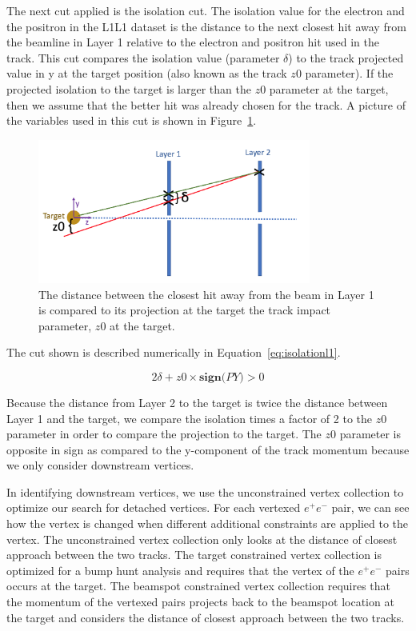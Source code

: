 The next cut applied is the isolation cut. The isolation value for the electron and the positron in the L1L1 dataset is the distance to the next closest hit away from the beamline in Layer 1 relative to the electron and positron hit used in the track. This cut compares the isolation value (parameter $\delta$) to the track projected value in y at the target position (also known as the track $z0$ parameter). If the projected isolation to the target is larger than the $z0$ parameter at the target, then we assume that the better hit was already chosen for the track. A picture of the variables used in this cut is shown in Figure~\ref{fig:isoPic}.

\begin{figure}[htb]
  \centering
      \includegraphics[width=0.8\textwidth]{pics/searching/isolationPic.png}
  \caption[Track isolation cut]{The distance between the closest hit away from the beam in Layer 1 is compared to its projection at the target the track impact parameter, $z0$ at the target. }
  \label{fig:isoPic}
\end{figure}

The cut shown is described numerically in Equation~\eqref{eq:isolationl1}.

\begin{equation}
\label{eq:isolationl1}
2\delta+z0\times\textbf{sign($PY$)}>0
\end{equation}
 
Because the distance from Layer 2 to the target is twice the distance between Layer 1 and the target, we compare the isolation times a factor of 2 to the $z0$ parameter in order to compare the projection to the target. The $z0$ parameter is opposite in sign as compared to the y-component of the track momentum because we only consider downstream vertices. 


\indent In identifying downstream vertices, we use the unconstrained vertex collection to optimize our search for detached vertices. For each vertexed $e^+e^-$ pair, we can see how the vertex is changed when different additional constraints are applied to the vertex. The unconstrained vertex collection only looks at the distance of closest approach between the two tracks. The target constrained vertex collection is optimized for a bump hunt analysis and requires that the vertex of the $e^+e^-$ pairs occurs at the target. The beamspot constrained vertex collection requires that the momentum of the vertexed pairs projects back to the beamspot location at the target and considers the distance of closest approach between the two tracks. 

